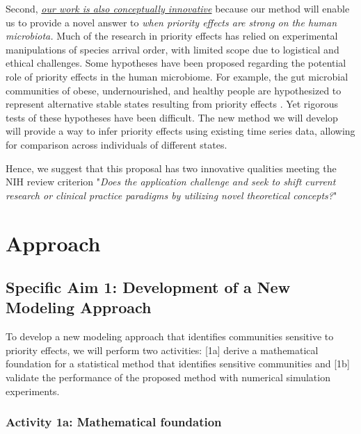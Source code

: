 \documentclass[12pt, class=article, crop=false]{standalone}
\begin{document}
Second, \ul{\emph{our work is also conceptually innovative}} because our method will enable us to provide a novel answer to \textit{when priority effects are strong on the human microbiota.}
Much of the research in priority effects has relied on experimental manipulations of species arrival order, with limited scope due to logistical and ethical challenges.
Some hypotheses have been proposed regarding the potential role of priority effects in the human microbiome.
For example, the gut microbial communities of obese, undernourished, and healthy people are hypothesized to represent alternative stable states resulting from priority effects \citep{fierer_animalcules_2012}.
Yet rigorous tests of these hypotheses have been difficult. 
The new method we will develop will provide a way to infer priority effects using existing time series data, allowing for comparison across individuals of different states.

Hence, we suggest that this proposal has two innovative qualities meeting the NIH review criterion "\emph{Does the application challenge and seek to shift current research or clinical practice paradigms by utilizing novel theoretical concepts?}"

\section{Approach}

\subsection*{Specific Aim 1: Development of a New Modeling Approach}

To develop a new modeling approach that identifies communities sensitive to priority effects, we will perform two activities:
[1a] derive a mathematical foundation for a statistical method that identifies sensitive communities and [1b] validate the performance of the proposed method with numerical simulation experiments.

\subsubsection*{Activity 1a: Mathematical foundation}
\end{document}
